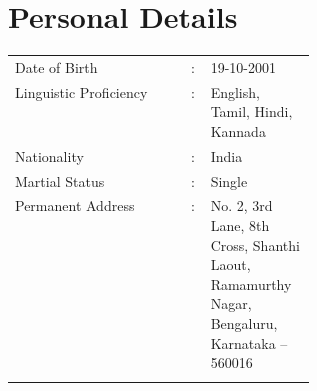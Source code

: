 \documentclass[letterpaper,11pt]{article}
\begin{document}
\section{Personal Details}
    \setlength{\tabcolsep}{20pt}
    \begin{tabular}{ l c p{0.35\linewidth}  }
          \vspace{5pt}
     {Date of Birth} & : &  19-10-2001 \\
          \vspace{5pt}
     {Linguistic Proficiency} & : & English, Tamil, Hindi, Kannada  \\ 
          \vspace{5pt}
     {Nationality} & : &  India\\ 
          \vspace{5pt}
    {Martial Status} & : & Single \\ 
          \vspace{5pt}
    {Permanent Address} & : &  No. 2, 3rd Lane, 8th Cross, \newline Shanthi Laout, Ramamurthy Nagar, \newline Bengaluru, Karnataka -- 560016\\ 
          \vspace{5pt}
          
    \end{tabular}
\end{document}
